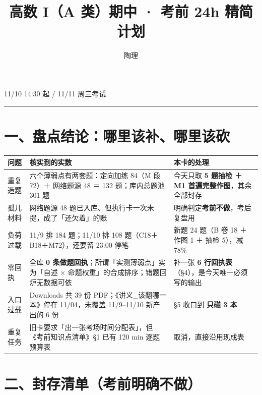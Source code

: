 \documentclass[11pt,a4paper]{ctexart}
\title{高数 I（A 类）期中 · 考前 24h 精简计划}
\author{陶理}
\begin{document}
\renewcommand{\arraystretch}{1.16}
\hfill{\small\color{tlblue}11/10 14:30 起 / 11/11 周三考试}
\par\noindent\rule{\linewidth}{0.4pt}\par\smallskip
{}

\section{一、盘点结论：哪里该补、哪里该砍}

\begin{center}\footnotesize
\begin{tabular}{@{}p{2.0cm}p{6.6cm}p{6.4cm}@{}}
\toprule
\textbf{问题} & \textbf{核实到的实数} & \textbf{本卡的处理} \\
\midrule
重复造题 & 六个薄弱点有两套题：定向加练 84（M 段 72）＋ 网络题源 48 ＝ 132 题；库内总题池 301 题 & 今天只取 \textbf{5 题抽检 ＋ M1 首遍完整作图}，其余全部封存 \\
孤儿材料 & 网络题源 48 题已入库、但执行卡一次未提，成了「还欠着」的账 & 明确判定\textbf{考前不做}，考后复盘用 \\
负荷过载 & 11/9 排 184 题；11/10 排 108 题（C18＋B18＋M72），还要留 23:00 停笔 & 新题 24 题（B 卷 18 ＋ 作图 1 ＋ 抽检 5），减 78\% \\
零回执 & 全库 \textbf{0 条做题回执}；所谓「实测薄弱点」实为「自述 × 命题权重」的合成排序；错题回炉无数据可依 & 补一张 \textbf{6 行回执表}（§4），是今天唯一必须写的输出 \\
入口过载 & Downloads 共 39 份 PDF；《讲义\_该翻哪一本》停在 11/04，未覆盖 11/9--11/10 新产出的 6 份 & §5 收口到 \textbf{只碰 3 本} \\
重复任务 & 旧卡要求「出一张考场时间分配表」，但《考前知识点清单》§1 已有 120 min 逐题预算表 & 取消，直接沿用现成表 \\
\bottomrule
\end{tabular}
\end{center}


\section{二、封存清单（考前明确不做）}
\end{document}
